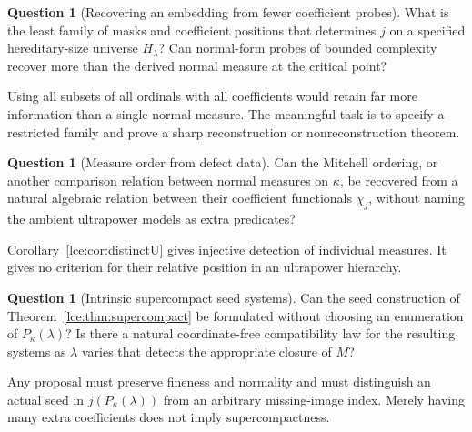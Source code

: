 \documentclass[11pt,letterpaper]{article}
\numberwithin{equation}{section}
\theoremstyle{definition}
\newtheorem{question}[theorem]{Question}
\theoremstyle{remark}
\newcommand{\thref}[1]{Theorem~\ref{#1}}
\begin{document}
\begin{question}[Recovering an embedding from fewer coefficient probes]\label{lce:q:probes}
What is the least family of masks and coefficient positions that determines
$j$ on a specified hereditary-size universe $H_\lambda$? Can normal-form
probes of bounded complexity recover more than the derived normal measure
at the critical point?
\end{question}
Using all subsets of all ordinals with all coefficients would retain
far more information than a single normal measure. The meaningful task
is to specify a restricted family and prove a sharp reconstruction or
nonreconstruction theorem.

\begin{question}[Measure order from defect data]\label{lce:q:mitchell}
Can the Mitchell ordering, or another comparison relation between normal
measures on $\kappa$, be recovered from a natural algebraic relation between
their coefficient functionals $\chi_j$, without naming the ambient
ultrapower models as extra predicates?
\end{question}
Corollary~\ref{lce:cor:distinctU} gives injective detection of individual
measures. It gives no criterion for their relative position in an
ultrapower hierarchy.

\begin{question}[Intrinsic supercompact seed systems]\label{lce:q:seeds}
Can the seed construction of \thref{lce:thm:supercompact} be formulated
without choosing an enumeration of $P_\kappa(\lambda)$? Is there a natural
coordinate-free compatibility law for the resulting systems as $\lambda$
varies that detects the appropriate closure of $M$?
\end{question}
Any proposal must preserve fineness and normality and must distinguish
an actual seed in $j(P_\kappa(\lambda))$ from an arbitrary missing-image
index. Merely having many extra coefficients does not imply
supercompactness.
\end{document}
